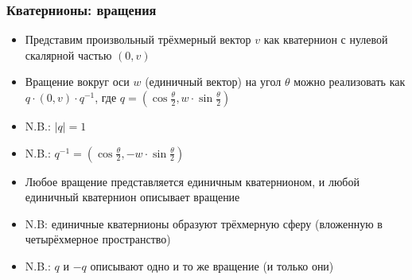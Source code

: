 \documentclass{beamer}
\begin{document}
\begin{frame}[fragile]
\frametitle{Кватернионы: вращения}
\begin{itemize}
\item Представим произвольный трёхмерный вектор \begin{math}v\end{math} как кватернион с нулевой скалярной частью \begin{math}(0, v)\end{math}
\pause
\item Вращение вокруг оси \begin{math}w\end{math} (единичный вектор) на угол \begin{math}\theta\end{math} можно реализовать как \begin{math}q \cdot (0, v) \cdot q^{-1}\end{math}, где \begin{math}q = (\cos \frac{\theta}{2}, w \cdot \sin \frac{\theta}{2})\end{math}
\pause
\item N.B.: \begin{math}|q| = 1\end{math}
\item N.B.: \begin{math}q^{-1} = (\cos \frac{\theta}{2}, - w \cdot \sin \frac{\theta}{2})\end{math}
\pause
\item Любое вращение представляется единичным кватернионом, и любой единичный кватернион описывает вращение
\item N.B: единичные кватернионы образуют трёхмерную сферу (вложенную в четырёхмерное пространство)
\item N.B.: \begin{math}q\end{math} и \begin{math}-q\end{math} описывают одно и то же вращение (и только они)
\end{itemize}
\end{frame}
\end{document}

